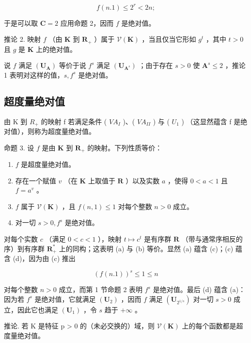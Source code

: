 \[
f (n. 1) \leqslant 2 ^ {r} <   2 n;
\]

于是可以取 \(\mathbf{C} = 2\) 应用命题 2，因而 \(f\) 是绝对值。

推论 2. 映射 \(f\) （由 \(\mathbf{K}\) 到 \(\mathbf{R}_+\) ）属于 \(\mathcal{V}(\mathbf{K})\) ，当且仅当它形如 \(g^t\) ，其中 \(t > 0\) 且 \(g\) 是 \(\mathbf{K}\) 上的绝对值。

说 \(f\) 满足 \((\mathbf{U}_{\mathbf{A}})\) 等价于说 \(f^s\) 满足 \((\mathbf{U}_{\mathbf{A}^s})\) ；由于存在 \(s > 0\) 使 \(\mathbf{A}^s \leqslant 2\) ，推论 1 表明对这样的值，\(s, f^s\) 是绝对值。

\subsection{超度量绝对值}

由 K 到 \(R_{+}\) 的映射 f 若满足条件 ( \(VA_{I}\) )、( \(VA_{II}\) ) 与 ( \(U_{1}\) ) （这显然蕴含 f 是绝对值），则称为超度量绝对值。

命题 3. 设 \(f\) 是由 \(\mathbf{K}\) 到 \(\mathbf{R}_+\) 的映射。下列性质等价：

\begin{enumerate}
\def\labelenumi{(\alph{enumi})}
\item
  \(f\) 是超度量绝对值。
\item
  存在一个赋值 \(v\) （在 \(\mathbf{K}\) 上取值于 \(\mathbf{R}\) ）以及实数 \(a\) ，使得 \(0 < a < 1\) 且 \(f = a^v\) 。
\item
  \(f\) 属于 \(\mathcal{V}(\mathbf{K})\) ，且 \(f(n,1) \leqslant 1\) 对每个整数 \(n > 0\) 成立。
\item
  对一切 \(s > 0, f^s\) 是绝对值。
\end{enumerate}

对每个实数 \(c\) （满足 \(0 < c < 1\) ），映射 \(t \mapsto c^t\) 是有序群 \(\mathbf{R}\) （带与通常序相反的序）到有序群 \(\mathbf{R}_+^*\) 上的同构；这表明 (a) 与 (b) 等价。显然 (a) 蕴含 (c)；(c) 蕴含 (d)，因为由 (c) 推出

\[
(f (n. 1)) ^ {s} \leqslant 1 \leqslant n
\]

对每个整数 \(n > 0\) 成立，而第 1 节命题 2 表明 \(f^s\) 是绝对值。最后 (d) 蕴含 (a)：因为若 \(f^s\) 是绝对值，它就满足 \((\mathbf{U}_2)\) ，因而 \(f\) 满足 \((\mathbf{U}_{2^{1 / s}})\) 对一切 \(s > 0\) 成立，因此它也满足 \((\mathbf{U}_1)\) ，令 \(s\) 趋于 \(+\infty\) 。

推论. 若 K 是特征 p > 0 的（未必交换的）域，则 \(\mathcal{V}(\mathbf{K})\) 上的每个函数都是超度量绝对值。


